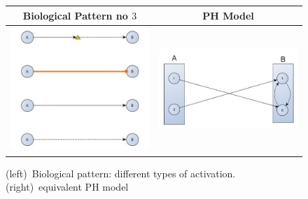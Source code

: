\documentclass[11pt,a4paper,twoside]{epig}
\begin{document}
\begin{figure}[ht]
\begin{tabular}{|c|c|}
\hline
Biological Pattern no $3$ & PH Model \\
\hline
 \includegraphics[scale=0.3]{./imagesannexe/phdrawings/3cyt.jpg} & \includegraphics[scale=0.15]{./imagesannexe/phdrawings/3ph.jpg} \\
 \hline
\end{tabular}
\caption{\label{fig:pattern:3}
(left)~Biological pattern: different types of activation.
(right)~equivalent PH model
}
\end{figure}
\end{document}
